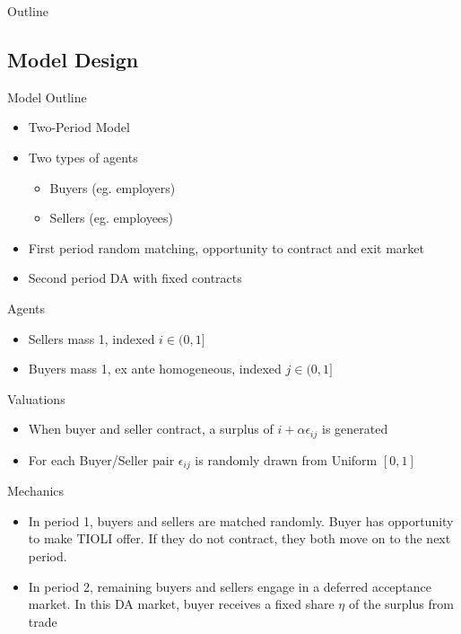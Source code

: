 \documentclass{beamer}
\begin{document}
\begin{frame}{Outline}
	\tableofcontents
\end{frame}

\subsection{Model Design}

\begin{frame}{Model Outline}
    \begin{itemize}
        \item <1-> Two-Period Model 
        \item <2-> Two types of agents
        \begin{itemize}
            \item Buyers (eg. employers)
            \item Sellers (eg. employees)
        \end{itemize}
        \item <3-> First period random matching, opportunity to contract and exit market
        \item <4-> Second period DA with fixed contracts
    \end{itemize}
\end{frame}
\begin{frame}{Agents}
\begin{itemize}
    \item Sellers mass 1, indexed $i \in (0,1]$
    \item  Buyers mass 1, ex ante homogeneous, indexed $j \in (0,1]$
\end{itemize}
\end{frame}

\begin{frame}{Valuations}
\begin{itemize}
    \item  When buyer and seller contract, a surplus of $i + \alpha \epsilon_{ij}$ is generated
    \item For each Buyer/Seller pair $\epsilon_{ij}$ is randomly drawn from Uniform $[0,1]$
\end{itemize}
\end{frame}


\begin{frame}{Mechanics}
    \begin{itemize}
    \item <1-> In period 1, buyers and sellers are matched randomly. Buyer has opportunity to make TIOLI offer.  If they do not contract, they both move on to the next period.
    \item <2-> In period 2, remaining buyers and sellers engage in a deferred acceptance market. In this DA market, buyer receives a fixed share $\eta$ of the surplus from trade

\end{itemize}
\end{frame}
\end{document}
